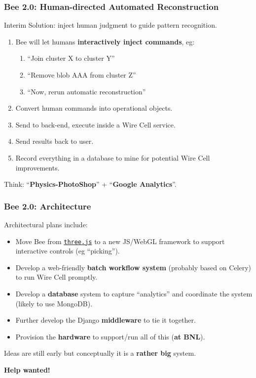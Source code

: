 \documentclass[xcolor=dvipsnames]{beamer}
\begin{document}
\begin{frame}
  \frametitle{Bee 2.0: Human-directed Automated Reconstruction}
  Interim Solution: inject human judgment to guide pattern recognition.
  \begin{enumerate}
  \item Bee will let humans \textbf{interactively inject commands}, eg:
    \begin{enumerate}
    \item ``Join cluster X to cluster Y''
    \item ``Remove blob AAA from cluster Z''
    \item ``Now, rerun automatic reconstruction''
    \end{enumerate}
  \item Convert human commands into operational objects.
  \item Send to back-end, execute inside a Wire Cell service.
  \item Send results back to user.
  \item Record everything in a database to mine for potential Wire
    Cell improvements.
  \end{enumerate}
  Think: ``\textbf{Physics-PhotoShop}'' + ``\textbf{Google Analytics}''.

\end{frame}

\begin{frame}
  \frametitle{Bee 2.0: Architecture}
  Architectural plans include:
  \begin{itemize}
  \item Move Bee from \href{http://threejs.org/}{\texttt{three.js}} to a new JS/WebGL framework to support interactive controls (eg ``picking'').
  \item Develop a web-friendly \textbf{batch workflow system} (probably based on Celery) to run Wire Cell promptly.
  \item Develop a \textbf{database} system to capture ``analytics'' and coordinate the system (likely to use MongoDB).
  \item Further develop the Django \textbf{middleware} to tie it together.
  \item Provision the \textbf{hardware} to support/run all of this (\textbf{at BNL}).
  \end{itemize}

  \vfill

  Ideas are still early but conceptually it is a \textbf{rather big} system.

  \vfill

  \textbf{Help wanted!}

\end{frame}
\end{document}
